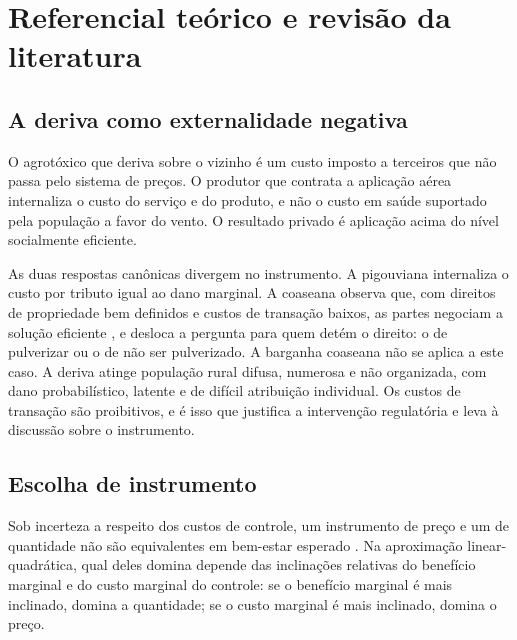 
\chapter{Referencial teórico e revisão da literatura}
\label{cap:referencial}

\section{A deriva como externalidade negativa}
\label{sec:externalidade}

O agrotóxico que deriva sobre o vizinho é um custo imposto a terceiros que não
passa pelo sistema de preços. O produtor que contrata a aplicação aérea
internaliza o custo do serviço e do produto, e não o custo em saúde suportado
pela população a favor do vento. O resultado privado é aplicação acima do nível
socialmente eficiente.

As duas respostas canônicas divergem no instrumento. A pigouviana internaliza o
custo por tributo igual ao dano marginal. A coaseana observa que, com direitos
de propriedade bem definidos e custos de transação baixos, as partes negociam a
solução eficiente \cite{coase1960}, e desloca a pergunta para quem detém o
direito: o de pulverizar ou o de não ser pulverizado. A barganha coaseana não
se aplica a este caso. A deriva atinge população rural difusa, numerosa e não
organizada, com dano probabilístico, latente e de difícil atribuição
individual. Os custos de transação são proibitivos, e é isso que justifica a
intervenção regulatória e leva à discussão sobre o instrumento.

\section{Escolha de instrumento}
\label{sec:instrumento}

Sob incerteza a respeito dos custos de controle, um instrumento de preço e um
de quantidade não são equivalentes em bem-estar esperado \cite{weitzman1974}.
Na aproximação linear-quadrática, qual deles domina depende das inclinações
relativas do benefício marginal e do custo marginal do controle: se o benefício
marginal é mais inclinado, domina a quantidade; se o custo marginal é mais
inclinado, domina o preço.

